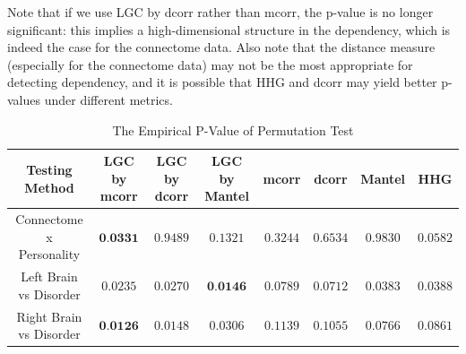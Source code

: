 \documentclass[11pt]{article}
\begin{document}
Note that if we use LGC by dcorr rather than mcorr, the p-value is no longer significant: this implies a high-dimensional structure in the dependency, which is indeed the case for the connectome data. Also note that the distance measure (especially for the connectome data) may not be the most appropriate for detecting dependency, and it is possible that HHG and dcorr may yield better p-values under different metrics.

\begin{table}[!t]
\footnotesize
\renewcommand{\arraystretch}{0.5}
\centering
{\begin{tabular}{|c||c|c|c|c|c|c|c|}
\hline
Testing Method & LGC by mcorr & LGC by dcorr & LGC by Mantel & mcorr & dcorr & Mantel & HHG \\
\hline
Connectome x Personality & $\textbf{0.0331}$ & $0.9489$  & $0.1321$ & $0.3244$ & $0.6534$ & $0.9830$  & $0.0582$ \\
\hline
Left Brain vs Disorder  & $0.0235$ & $0.0270$ & $\textbf{0.0146}$ & $0.0789$ & $0.0712$ & $0.0383$ & $0.0388$ \\
\hline
Right Brain vs Disorder & $\textbf{0.0126}$ & $0.0148$  & $0.0306$ & $0.1139$ & $0.1055$  & $0.0766$ & $0.0861$\\
\hline
\end{tabular}
\caption{The Empirical P-Value of Permutation Test}
\label{table1}
}
\end{table}
\end{document}
